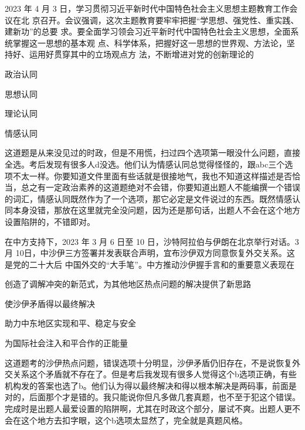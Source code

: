 \documentclass[lang=cn,blue,10pt,scheme=chinese,twocol]{zznote}
\begin{document}
\begin{exercise}2023 年 4 月 3 日，学习贯彻习近平新时代中国特色社会主义思想主题教育工作会议在北 京召开。会议强调，这次主题教育要牢牢把握“学思想、强党性、重实践、建新功”的总要 求。要全面学习领会习近平新时代中国特色社会主义思想，全面系统掌握这一思想的基本观 点、科学体系，把握好这一思想的世界观、方法论，坚持好、运用好贯穿其中的立场观点方 法，不断增进对党的创新理论的
	\begin{choice}
		\item 政治认同
		\item 思想认同
		\item 理论认同
		\item 情感认同
	\end{choice}
\end{exercise}
\begin{solution}
	这道题是从来没见过的时政，但是不用慌，扫过四个选项第一眼没什么问题，直接全选。考后发现有很多人d没选。他们认为情感认同总觉得怪怪的，跟abc三个选项不太一样。你要知道文件里面有些话就是很接地气，我也不知道这样描述是否恰当，总之有一定政治素养的这道题绝对不会错，你要知道出题人不能编撰一个错误的词汇，情感认同既然作为了一个选项，那它必定是文件说过的东西。既然情感认同本身没错，那放在这里就完全没问题，因为还是那句话，出题人不会在这个地方设置陷阱的，不错即对。
\end{solution}


\begin{exercise}在中方支持下，2023 年 3 月 6 日至 10 日，沙特阿拉伯与伊朗在北京举行对话。3 月 10日，中沙伊三方签署并发表联合声明，宜布沙伊双方同意恢复外交关系。这是党的二十大后 中国外交的“大手笔”。中方推动沙伊握手言和的重要意义表现在
	\begin{choice}
		\item 创造了调解冲突的新范式，为其他地区热点问题的解决提供了新思路
		\item 使沙伊矛盾得以最终解决
		\item 助力中东地区实现和平、稳定与安全
		\item 为国际社会注入和平合作的正能量
	\end{choice}
\end{exercise}
\begin{solution}
	这道题考的沙伊热点问题，错误选项十分明显，沙伊矛盾仍旧存在，不是说恢复外交关系这个矛盾就不存在了。但是考后我发现有很多人觉得这个b选项正确，有些机构发的答案也选了b。他们认为得以最终解决和得以根本解决是两码事，前面是对的，后面那个才是错的。我只能说你但凡多做几套真题，也不至于犯这个错误。完成时是出题人最爱设置的陷阱啊，尤其在时政这个部分，屡试不爽。出题人更不会在这个地方去扣字眼，这个b选项太显然了，完全就是真题风格。
\end{solution}
\end{document}
